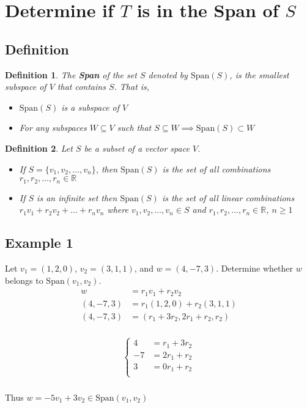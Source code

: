 \documentclass[10pt, oneside]{article}
\newcommand{\R}{\mathbb{R}}
\newtheorem{defn}{Definition}
\begin{document}
\section{Determine if $T$ is in the Span of $S$}

\subsection{Definition}

\begin{defn}
	The \textbf{Span} of the set $S$ denoted by $\text{Span}(S)$, is the smallest subspace of $V$
	that contains $S$. That is,
	\begin{itemize}
		\item $\text{Span}(S)$ is a subspace of $V$
		\item For any subspaces $W \subseteq V$ such that $S \subseteq W \implies \text{Span}(S) \subset W$
	\end{itemize}
\end{defn}

\begin{defn}
	Let $S$ be a subset of a vector space $V$.
	\begin{itemize}
		\item If $S = \{v_1, v_2, \ldots, v_n\}$, then $\text{Span}(S)$ is the set of all combinations
		      $r_1, r_2, \ldots, r_n \in \R$
		\item If $S$ is an infinite set then $\text{Span}(S)$ is the set of all linear combinations
		      $r_1v_1 + r_2v_2 + \ldots + r_nv_n$ where $v_1, v_2, \ldots, v_n \in S$ and $r_1, r_2, \ldots, r_n \in \R$, $n \ge 1$
	\end{itemize}
\end{defn}

\subsection{Example 1}

Let $v_1 = (1, 2, 0)$, $v_2 = (3,1,1)$, and $w = (4,-7,3)$. Determine whether $w$ belongs to $\text{Span}(v_1, v_2)$.
\[
	\begin{split}
		w &= r_1v_1 + r_2v_2 \\
		(4,-7,3) &= r_1(1,2,0) + r_2(3,1,1) \\
		(4,-7,3) &= (r_1 + 3r_2, 2r_1 + r_2, r_2) \\
	\end{split}
\]
\begin{center}
	\[
		\begin{split}
			\begin{cases}
				4  & = r_1 + 3r_2 \\
				-7 & = 2r_1 + r_2 \\
				3  & = 0r_1 + r_2 \\
			\end{cases} \\
		\end{split}
	\]
\end{center}
Thus $w = -5v_1 + 3v_2 \in \text{Span}(v_1, v_2)$
\end{document}
